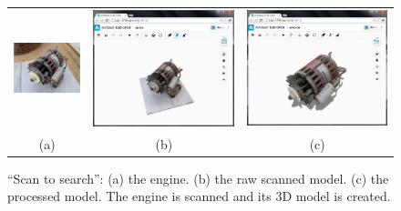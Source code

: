 \newpage

\begin{figure}
\begin{center}
\begin{tabular}{ccc}   %
   \includegraphics[height=0.23\columnwidth]{input_engine_photo_scantosearch_test}& 
   \includegraphics[height=0.23\columnwidth]{input_engine_rawscanned_scantosearch_test}&
   \includegraphics[height=0.23\columnwidth]{input_engine_scanned_scantosearch_test}\\
   (a) & (b) & (c)
\end{tabular}
\caption{``Scan to search'': (a) the engine. (b) the raw scanned model. (c) the processed model. The engine is scanned and its 3D model is created. } 
  \label{scantosearchtest_engine_scanning}
\end{center}
\end{figure}

